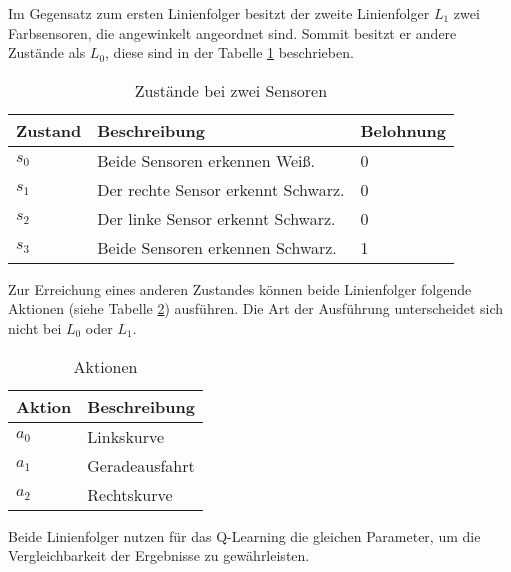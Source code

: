 Im Gegensatz zum ersten Linienfolger besitzt der zweite Linienfolger $L_1$ zwei Farbsensoren, die angewinkelt angeordnet sind. Sommit besitzt er andere Zustände als $L_0$, diese sind in der Tabelle \ref{tab:zustaende_zwei_sensoren} beschrieben.

\begin{table}[h]
  \caption{Zustände bei zwei Sensoren}
  \label{tab:zustaende_zwei_sensoren}
  \renewcommand{\arraystretch}{1.2}
  \centering
  \sffamily
  \begin{footnotesize}
    \begin{tabular}{l l l}
    \toprule
    \textbf{Zustand} & \textbf{Beschreibung} & \textbf{Belohnung}\\
    \midrule
    $s_0$	&	Beide Sensoren erkennen Weiß.	&	0\\
    $s_1$	&	Der rechte Sensor erkennt Schwarz.	&	0\\
    $s_2$	&	Der linke Sensor erkennt Schwarz.	&	0\\
    $s_3$	&	Beide Sensoren erkennen Schwarz.	&	1\\
    \bottomrule
    \end{tabular}
  \end{footnotesize}
  \rmfamily
\end{table}

Zur Erreichung eines anderen Zustandes können beide Linienfolger folgende Aktionen (siehe Tabelle \ref{tab:aktionen}) ausführen. Die Art der Ausführung unterscheidet sich nicht bei $L_0$ oder $L_1$.

\begin{table}[h]
  \caption{Aktionen}
  \label{tab:aktionen}
  \renewcommand{\arraystretch}{1.2}
  \centering
  \sffamily
  \begin{footnotesize}
    \begin{tabular}{l l}
    \toprule
    \textbf{Aktion} & \textbf{Beschreibung}\\
    \midrule
    $a_0$	&	Linkskurve\\
    $a_1$	&	Ge­ra­de­aus­fahrt\\
    $a_2$	&	Rechtskurve\\
    \bottomrule
    \end{tabular}
  \end{footnotesize}
  \rmfamily
\end{table}

Beide Linienfolger nutzen für das Q-Learning die gleichen Parameter, um die Vergleichbarkeit der Ergebnisse zu gewährleisten.

